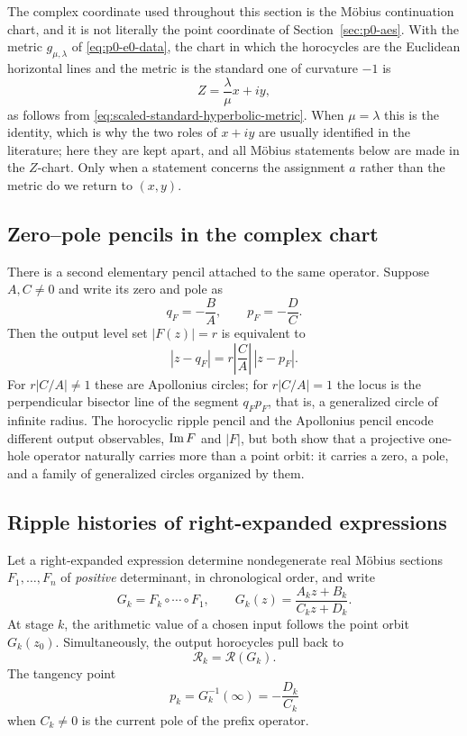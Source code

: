 \begin{remark}
\label{rem:p0-ripple-normalization}
The complex coordinate used throughout this section is the Möbius continuation
chart, and it is not literally the point coordinate of
Section~\ref{sec:p0-aes}.  With the metric $g_{\mu,\lambda}$ of
\eqref{eq:p0-e0-data}, the chart in which the horocycles are the Euclidean
horizontal lines and the metric is the standard one of curvature $-1$ is
\[
  Z=\frac{\lambda}{\mu}x+iy,
\]
as follows from \eqref{eq:scaled-standard-hyperbolic-metric}.  When
$\mu=\lambda$ this is the identity, which is why the two roles of $x+iy$ are
usually identified in the literature; here they are kept apart, and all
Möbius statements below are made in the $Z$-chart.  Only when a statement
concerns the assignment $a$ rather than the metric do we return to $(x,y)$.
\end{remark}

\subsection{Zero--pole pencils in the complex chart}

There is a second elementary pencil attached to the same operator.  Suppose
$A,C\ne0$ and write its zero and pole as
\[
  q_F=-\frac BA,
  \qquad
  p_F=-\frac DC.
\]
Then the output level set $|F(z)|=r$ is equivalent to
\begin{equation}\label{eq:p0-apollonius-pencil}
  |z-q_F|
  =r\left|\frac CA\right|\,|z-p_F|.
\end{equation}
For $r|C/A|\ne1$ these are Apollonius circles; for $r|C/A|=1$ the locus is the
perpendicular bisector line of the segment $q_Fp_F$, that is, a generalized
circle of infinite radius.  The horocyclic
ripple pencil and the Apollonius pencil encode different output observables,
$\operatorname{Im} F$ and $|F|$, but both show that a projective one-hole operator naturally
carries more than a point orbit: it carries a zero, a pole, and a family of
generalized circles organized by them.

\subsection{Ripple histories of right-expanded expressions}

Let a right-expanded expression determine nondegenerate real M\"obius sections
$F_1,\ldots,F_n$ of \emph{positive} determinant, in chronological order, and
write
\[
  G_k=F_k\circ\cdots\circ F_1,
  \qquad
  G_k(z)=\frac{A_kz+B_k}{C_kz+D_k}.
\]
At stage $k$, the arithmetic value of a chosen input follows the point orbit
$G_k(z_0)$.  Simultaneously, the output horocycles pull back to
\[
  \mathcal R_k=\mathcal R(G_k).
\]
The tangency point
\[
  p_k=G_k^{-1}(\infty)
  =-\frac{D_k}{C_k}
\]
when $C_k\ne0$ is the current pole of the prefix operator.

